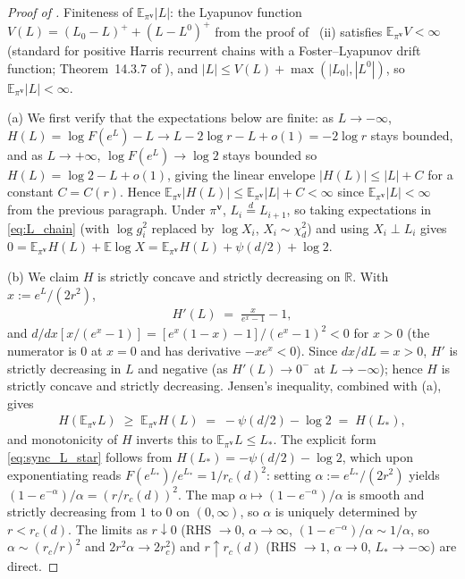 \documentclass{article}
\newcommand{\RR}{\mathbb{R}}
\newcommand{\Exp}[1]{\mathbb{E} #1}
\newcommand{\Expsubidx}[2]{\mathbb{E}_{#1} #2}
\newcommand{\bv}{\mathbf{v}}
\begin{document}
\begin{proof}[Proof of ]
  Finiteness of $\Expsubidx{\pi^{\bv}}{|L|}$: the Lyapunov function $V(L) = (L_0 - L)^+ + (L - L^0)^+$ from the proof of ~(ii) satisfies $\Expsubidx{\pi^{\bv}}{V} < \infty$ (standard for positive Harris recurrent chains with a Foster--Lyapunov drift function; Theorem~14.3.7 of \cite{meyn1993markov}), and $|L| \le V(L) + \max(|L_0|, |L^0|)$, so $\Expsubidx{\pi^{\bv}}{|L|} < \infty$.

  (a) We first verify that the expectations below are finite: as $L \to -\infty$, $H(L) = \log F(e^L) - L \to L - 2\log r - L + o(1) = -2\log r$ stays bounded, and as $L \to +\infty$, $\log F(e^L) \to \log 2$ stays bounded so $H(L) = \log 2 - L + o(1)$, giving the linear envelope $|H(L)| \le |L| + C$ for a constant $C = C(r)$. Hence $\Expsubidx{\pi^{\bv}}{|H(L)|} \le \Expsubidx{\pi^{\bv}}{|L|} + C < \infty$ since $\Expsubidx{\pi^{\bv}}{|L|} < \infty$ from the previous paragraph.
  Under $\pi^{\bv}$, $L_i \stackrel{d}{=} L_{i+1}$, so taking expectations in \eqref{eq:L_chain} (with $\log g_i^2$ replaced by $\log X_i$, $X_i \sim \chi^2_d$) and using $X_i \perp L_i$ gives $0 = \Expsubidx{\pi^{\bv}}{H(L)} + \Exp{\log X} = \Expsubidx{\pi^{\bv}}{H(L)} + \psi(d/2) + \log 2$.

  (b) We claim $H$ is strictly concave and strictly decreasing on $\RR$. With $x := e^L/(2 r^2)$,
  \begin{eqnarray*}
    H'(L) \;=\; \frac{x}{e^x - 1} - 1,
  \end{eqnarray*}
  and $d/dx[x/(e^x - 1)] = [e^x(1-x) - 1]/(e^x - 1)^2 < 0$ for $x > 0$ (the numerator is $0$ at $x = 0$ and has derivative $-x e^x < 0$). Since $dx/dL = x > 0$, $H'$ is strictly decreasing in $L$ and negative (as $H'(L) \to 0^-$ at $L \to -\infty$); hence $H$ is strictly concave and strictly decreasing. Jensen's inequality, combined with (a), gives
  \begin{eqnarray*}
    H(\Expsubidx{\pi^{\bv}}{L}) \;\ge\; \Expsubidx{\pi^{\bv}}{H(L)} \;=\; -\psi(d/2) - \log 2 \;=\; H(L_*),
  \end{eqnarray*}
  and monotonicity of $H$ inverts this to $\Expsubidx{\pi^{\bv}}{L} \le L_*$. The explicit form \eqref{eq:sync_L_star} follows from $H(L_*) = -\psi(d/2) - \log 2$, which upon exponentiating reads $F(e^{L_*})/e^{L_*} = 1/r_c(d)^2$: setting $\alpha := e^{L_*}/(2 r^2)$ yields $(1 - e^{-\alpha})/\alpha = (r/r_c(d))^2$. The map $\alpha \mapsto (1 - e^{-\alpha})/\alpha$ is smooth and strictly decreasing from $1$ to $0$ on $(0, \infty)$, so $\alpha$ is uniquely determined by $r < r_c(d)$. The limits as $r \downarrow 0$ (RHS $\to 0$, $\alpha \to \infty$, $(1-e^{-\alpha})/\alpha \sim 1/\alpha$, so $\alpha \sim (r_c/r)^2$ and $2 r^2 \alpha \to 2 r_c^2$) and $r \uparrow r_c(d)$ (RHS $\to 1$, $\alpha \to 0$, $L_* \to -\infty$) are direct.
\end{proof}
\end{document}
